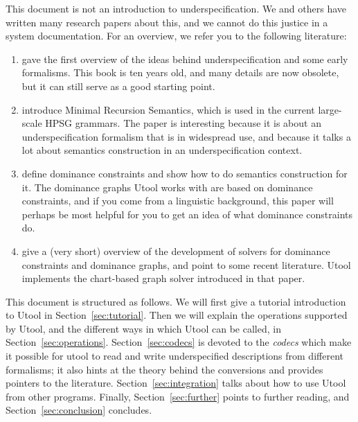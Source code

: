 This document is not an introduction to underspecification. We and
others have written many research papers about this, and we cannot do
this justice in a system documentation. For an overview, we refer you
to the following literature:
\begin{enumerate}
\item {} gave the first overview of the ideas
behind underspecification and some early formalisms. This book is ten
years old, and many details are now obsolete, but it can still serve
as a good starting point.
\item {} introduce Minimal Recursion Semantics, which
is used in the current large-scale HPSG grammars. The paper is
interesting because it is about an underspecification formalism that
is in widespread use, and because it talks a lot about semantics
construction in an underspecification context.
\item {} define dominance constraints and show how to do
semantics construction for it. The dominance graphs Utool works with
are based on dominance constraints, and if you come from a linguistic
background, this paper will perhaps be most helpful for you to get an
idea of what dominance constraints do.
\item {} give a (very short) overview of the
development of solvers for dominance constraints and dominance graphs,
and point to some recent literature. Utool implements the chart-based
graph solver introduced in that paper.
\end{enumerate}


This document is structured as follows. We will first give a tutorial
introduction to Utool in Section~\ref{sec:tutorial}. Then we will
explain the operations supported by Utool, and the different ways in
which Utool can be called, in
Section~\ref{sec:operations}. Section~\ref{sec:codecs} is devoted to
the \emph{codecs} which make it possible for utool to read and write
underspecified descriptions from different formalisms; it also hints
at the theory behind the conversions and provides pointers to the
literature. Section~\ref{sec:integration} talks about how to use Utool
from other programs. Finally, Section~\ref{sec:further} points to
further reading, and Section~\ref{sec:conclusion} concludes.

